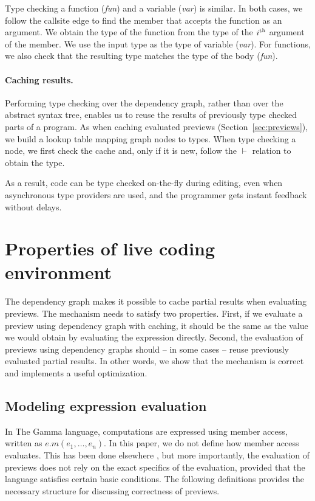 \documentclass[acmsmall,anonymous,fleqn]{acmart}\settopmatter{printfolios=false,printccs=false,printacmref=false}
\theoremstyle{plain}
\theoremstyle{definition}
\newcommand{\blbl}[1]{\textnormal{\textcolor{numclr}{\sffamily #1}}}
\begin{document}
Type checking a function (\emph{fun}) and a variable (\emph{var}) is similar. In both cases,
we follow the \blbl{callsite} edge to find the member that accepts the function as an argument.
We obtain the type of the function from the type of the $i^\textnormal{th}$ argument of the
member. We use the input type as the type of variable (\emph{var}). For functions, we also check
that the resulting type matches the type of the body (\emph{fun}).

\paragraph{Caching results.}
Performing type checking over the dependency graph, rather than over the abstract syntax tree,
enables us to reuse the results of previously type checked parts of a program. As when
caching evaluated previews (Section~\ref{sec:previews}), we build a lookup table mapping graph
nodes to types. When type checking a node, we first check the cache and, only if it is new,
follow the $\vdash$ relation to obtain the type.

As a result, code can be type checked on-the-fly during editing, even when asynchronous type
providers are used, and the programmer gets instant feedback without delays.


\section{Properties of live coding environment}
\label{sec:properties}

The dependency graph makes it possible to cache partial results when evaluating previews.
The mechanism needs to satisfy two properties.
First, if we evaluate a preview using dependency graph with caching, it should be the same as the
value we would obtain by evaluating the expression directly. Second, the evaluation of previews
using dependency graphs should -- in some cases -- reuse previously evaluated partial results.
In other words, we show that the mechanism is correct and implements a useful optimization.

\subsection{Modeling expression evaluation}
In The Gamma language, computations are expressed using
member access, written as $e.m(e_1,\ldots, e_n)$. In this paper, we do not define how member
access evaluates. This has been done elsewhere \cite{gamma}, but more importantly, the evaluation of
previews does not rely on the exact specifics of the evaluation, provided that the language
satisfies certain basic conditions. The following definitions provides the necessary structure
for discussing correctness of previews.
\end{document}
